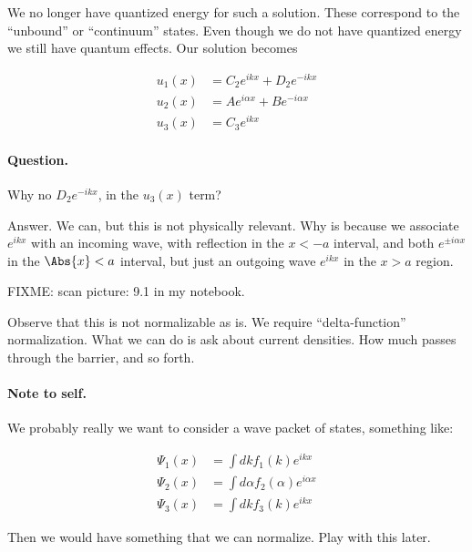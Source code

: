 {We no longer have quantized energy for such a solution.  These correspond to the ``unbound'' or ``continuum'' states.  Even though we do not have quantized energy we still have quantum effects.  Our solution becomes

\begin{equation}\label{eqn:lecture9boundStates:320}
\begin{aligned}
u_1(x) &=
C_2 e^{i k x}
+D_2 e^{-i k x}  \\
u_2(x) &=
A e^{i \alpha x}
+B e^{-i \alpha x}  \\
u_3(x) &=
C_3 e^{i k x}
\end{aligned}
\end{equation}

\paragraph{Question.}  Why no \(D_2 e^{-i k x}\), in the \(u_3(x)\) term?

Answer.  We can, but this is not physically relevant.  Why is because we associate \(e^{ikx}\) with an incoming wave, with reflection in the \(x < -a\) interval, and both \(e^{\pm i \alpha x}\) in the \(\Abs{x} < a\) interval, but just an outgoing wave \(e^{i k x}\) in the \(x > a\) region.

FIXME: scan picture: 9.1 in my notebook.

Observe that this is not normalizable as is.  We require ``delta-function'' normalization.  What we can do is ask about current densities.  How much passes through the barrier, and so forth.


\paragraph{Note to self.}
We probably really we want to consider a wave packet of states, something like:

\begin{equation}\label{eqn:lecture9boundStates:340}
\begin{aligned}
\Psi_1(x) &= \int dk f_1(k) e^{i k x} \\
\Psi_2(x) &= \int d\alpha f_2(\alpha) e^{i \alpha x} \\
\Psi_3(x) &= \int dk f_3(k) e^{i k x}
\end{aligned}
\end{equation}

Then we would have something that we can normalize.  Play with this later.

} %
